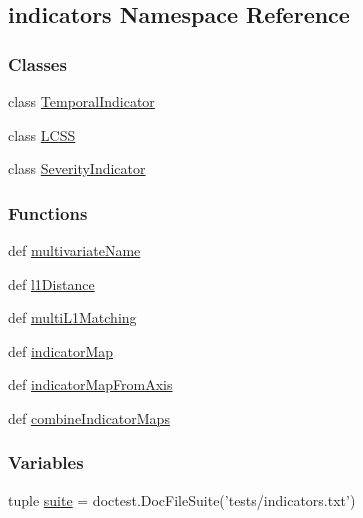 \hypertarget{namespaceindicators}{\subsection{indicators Namespace Reference}
\label{namespaceindicators}
}
\subsubsection*{Classes}
\begin{DoxyCompactItemize}
\item 
class \hyperlink{classindicators_1_1TemporalIndicator}{Temporal\-Indicator}
\item 
class \hyperlink{classindicators_1_1LCSS}{L\-C\-S\-S}
\item 
class \hyperlink{classindicators_1_1SeverityIndicator}{Severity\-Indicator}
\end{DoxyCompactItemize}
\subsubsection*{Functions}
\begin{DoxyCompactItemize}
\item 
def \hyperlink{namespaceindicators_aa9cbd34d7377d42d504cc973bb60bbf9}{multivariate\-Name}
\item 
def \hyperlink{namespaceindicators_a8710f906297cfaf1a3964a9ae002d440}{l1\-Distance}
\item 
def \hyperlink{namespaceindicators_ad4244edaf14477c03ad5d7d9db5d6837}{multi\-L1\-Matching}
\item 
def \hyperlink{namespaceindicators_a153a4e3d9126e177a85183020b6dea3e}{indicator\-Map}
\item 
def \hyperlink{namespaceindicators_a287a5af3cf70530d8659aeacdb7f190f}{indicator\-Map\-From\-Axis}
\item 
def \hyperlink{namespaceindicators_a52ed5b71f3921f2a2eaa91339380a87f}{combine\-Indicator\-Maps}
\end{DoxyCompactItemize}
\subsubsection*{Variables}
\begin{DoxyCompactItemize}
\item 
tuple \hyperlink{namespaceindicators_a26325b4cd481f5e26db3cf81d7adecdd}{suite} = doctest.\-Doc\-File\-Suite('tests/indicators.\-txt')
\end{DoxyCompactItemize}


